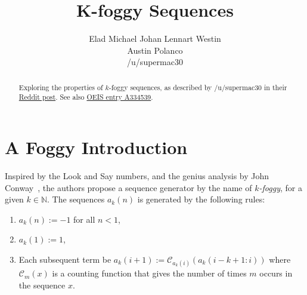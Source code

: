 \documentclass{article}
\title{K-foggy Sequences}
\author{
  Elad Michael   
   \And
  Johan Lennart Westin \\
  \And
  Austin Polanco \\
  \And
  /u/supermac30 \\ %
}
\begin{document}
\maketitle

\begin{abstract}
	Exploring the properties of $k$-foggy sequences, as described by /u/supermac30 in their \href{https://www.reddit.com/r/math/comments/gdsjth/foggy_sequences/}{Reddit post}. See also \href{https://oeis.org/A334539}{OEIS entry A334539}.
\end{abstract}







\section{A Foggy Introduction}
\label{sec:introduction}

Inspired by the Look and Say numbers, and the genius analysis by John Conway~\cite{thomas1987open}, the authors propose a sequence generator by the name of \emph{$k$-foggy}, for a given $k\in\mathbb{N}$. The sequences $a_{k}(n)$ is generated by the following rules:

\begin{enumerate}
	\item $a_k(n) := -1$ for all $n < 1$,
	\item $a_k(1) := 1$,
	\item Each subsequent term be $a_k(i+1) := \mathcal{C}_{a_k(i)}(a_k(i-k+1:i))$ where $\mathcal{C}_{m}(x)$ is a counting function that gives the number of times $m$ occurs in the sequence $x$.
\end{enumerate}
\end{document}
